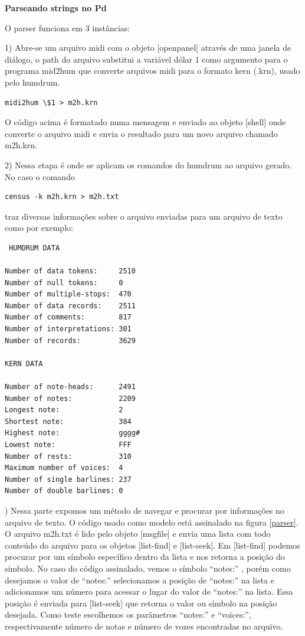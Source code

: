 \documentclass{ppgmus}
\begin{document}
\textbf{Parseando strings no Pd}


O parser funciona em 3 instâncias:

1) Abre-se um arquivo midi com o objeto [openpanel] através
de uma janela de diálogo, o path do arquivo substitui a variável 
dólar 1 como argumento para o programa mid2hum que converte
arquivos midi para o formato kern (.krn), usado pelo humdrum.

\singlespacing
\footnotesize
\begin{verbatim}
midi2hum \$1 > m2h.krn
\end{verbatim}
\normalsize
\doublespacing

 

  O código acima é formatado numa mensagem e enviado ao objeto
[shell] onde converte o arquivo midi e envia o resultado para
um novo arquivo chamado m2h.krn.
 
2) Nessa etapa é onde se aplicam os comandos do humdrum ao 
arquivo gerado. No caso o comando
\singlespacing
\footnotesize
\begin{verbatim}
census -k m2h.krn > m2h.txt
\end{verbatim}
\normalsize
\doublespacing 
traz diversas informações sobre o arquivo enviadas para um 
arquivo de texto como por exemplo:
\singlespacing
\footnotesize
\begin{verbatim}
 HUMDRUM DATA

Number of data tokens:     2510
Number of null tokens:     0
Number of multiple-stops:  470
Number of data records:    2511
Number of comments:        817
Number of interpretations: 301
Number of records:         3629

KERN DATA

Number of note-heads:      2491
Number of notes:           2209
Longest note:              2
Shortest note:             384
Highest note:              gggg#
Lowest note:               FFF
Number of rests:           310
Maximum number of voices:  4
Number of single barlines: 237
Number of double barlines: 0
\end{verbatim} 
\normalsize
{}) Nessa parte expomos um método de navegar e procurar por
informações no arquivo de texto. O código usado como modelo
está assinalado na figura \ref{parser}. O arquivo m2h.txt
é lido pelo objeto [msgfile] e envia uma lista com todo conteúdo
do arquivo para os objetos [list-find] e [list-seek]. Em [list-find]
podemos procurar por um símbolo específico dentro da lista e nos retorna
a posição do símbolo. No caso do código assinalado, vemos o símbolo 
``notes:'' , porém como desejamos o valor de ``notes:'' selecionamos a posição
de ``notes:'' na lista e adicionamos um número para acessar o lugar do valor de
``notes:'' na lista. Essa posição é enviada para [list-seek] que retorna o valor ou
símbolo na posição desejada. Como teste escolhemos os parâmetros ``notes:'' e ``voices:'', 
respectivamente número de notas e número de vozes encontradas no arquivo.
\end{document}

